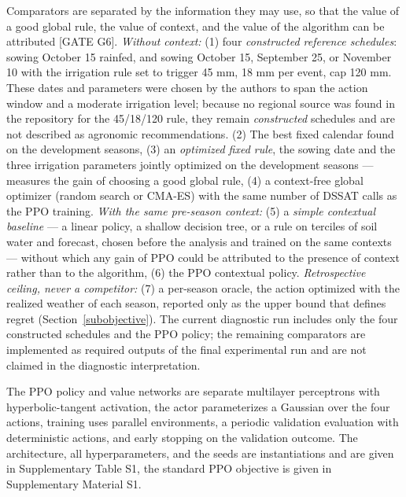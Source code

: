 \documentclass[times,final,authoryear]{elsarticle}
\begin{document}
Comparators are separated by the information they may use, so that the value of a good global rule, the value of context, and the value of the algorithm can be attributed [GATE G6]. \emph{Without context:} (1) four \emph{constructed reference schedules}: sowing October 15 rainfed, and sowing October 15, September 25, or November 10 with the irrigation rule set to trigger 45 mm, 18 mm per event, cap 120 mm. These dates and parameters were chosen by the authors to span the action window and a moderate irrigation level; because no regional source was found in the repository for the 45/18/120 rule, they remain \emph{constructed} schedules and are not described as agronomic recommendations. (2) The best fixed calendar found on the development seasons, (3) an \emph{optimized fixed rule}, the sowing date and the three irrigation parameters jointly optimized on the development seasons --- measures the gain of choosing a good global rule, (4) a context-free global optimizer (random search or CMA-ES) with the same number of DSSAT calls as the PPO training. \emph{With the same pre-season context:} (5) a \emph{simple contextual baseline} --- a linear policy, a shallow decision tree, or a rule on terciles of soil water and forecast, chosen before the analysis and trained on the same contexts --- without which any gain of PPO could be attributed to the presence of context rather than to the algorithm, (6) the PPO contextual policy. \emph{Retrospective ceiling, never a competitor:} (7) a per-season oracle, the action optimized with the realized weather of each season, reported only as the upper bound that defines regret (Section~\ref{subobjective}). The current diagnostic run includes only the four constructed schedules and the PPO policy; the remaining comparators are implemented as required outputs of the final experimental run and are not claimed in the diagnostic interpretation.

The PPO policy and value networks are separate multilayer perceptrons with hyperbolic-tangent activation, the actor parameterizes a Gaussian over the four actions, training uses parallel environments, a periodic validation evaluation with deterministic actions, and early stopping on the validation outcome. The architecture, all hyperparameters, and the seeds are instantiations and are given in Supplementary Table S1, the standard PPO objective is given in Supplementary Material S1.
\end{document}

